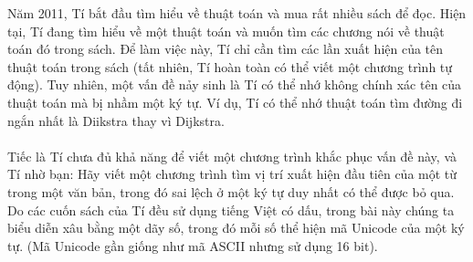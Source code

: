 Năm 2011, Tí bắt đầu tìm hiểu về thuật toán và mua rất nhiều sách để đọc. Hiện tại, Tí đang tìm hiểu về một thuật toán và muốn tìm các chương nói về thuật toán đó trong sách. Để làm việc này, Tí chỉ cần tìm các lần xuất hiện của tên thuật toán trong sách (tất nhiên, Tí hoàn toàn có thể viết một chương trình tự động). Tuy nhiên, một vấn đề nảy sinh là Tí có thể nhớ không chính xác tên của thuật toán mà bị nhầm một ký tự. Ví dụ, Tí có thể nhớ thuật toán tìm đường đi ngắn nhất là Diikstra thay vì Dijkstra.
\\
\\Tiếc là Tí chưa đủ khả năng để viết một chương trình khắc phục vấn đề này, và Tí nhờ bạn: Hãy viết một chương trình tìm vị trí xuất hiện đầu tiên của một từ trong một văn bản, trong đó sai lệch ở một ký tự duy nhất có thể được bỏ qua. Do các cuốn sách của Tí đều sử dụng tiếng Việt có dấu, trong bài này chúng ta biểu diễn xâu bằng một dãy số, trong đó mỗi số thể hiện mã Unicode của một ký tự. (Mã Unicode gần giống như mã ASCII nhưng sử dụng 16 bit).